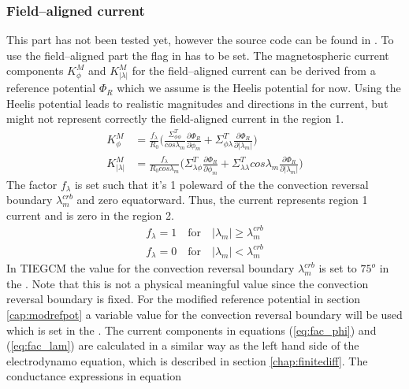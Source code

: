 \subsubsection{Field--aligned current}\label{cap:fldalg_curr}
%
This part has not been tested yet, however the source code can be found in 
. To use the field--aligned part 
the flag   
in   has to be set. 
The magnetospheric current components $K_{\phi}^M$ and 
$K_{|\lambda|}^M$ for the field--aligned current can be derived 
from a reference potential 
$\Phi_R$ which we assume is the Heelis potential for now. Using the
Heelis potential leads to realistic magnitudes and directions 
in the current, but
might not represent correctly the field-aligned current in the region 1.
%
\begin{align}
  K_{\phi}^M       &=  \frac{f_{\lambda}}{R_0} \bigl( \frac{\Sigma_{\phi \phi}^T}{cos
   \lambda_m} \frac{\partial \Phi_R}{\partial \phi_m} + 
   \Sigma_{\phi \lambda}^T \frac{\partial \Phi_R}{\partial |\lambda_m|} \bigr) \label{eq:fac_phi}\\
  K_{|\lambda|}^M  &= \frac{f_{\lambda}}{R_0 cos \lambda_m} \bigl( \Sigma_{\lambda \phi}^T
    \frac{\partial \Phi_R}{\partial \phi_m} + 
   \Sigma_{\lambda \lambda}^T cos \lambda_m 
   \frac{\partial \Phi_R}{\partial |\lambda_m|} \bigr) \label{eq:fac_lam}
\end{align}
%
The factor $f_{\lambda}$ is set such that it's 1 poleward of the the convection reversal
boundary $ \lambda_m^{crb}$ and zero equatorward. Thus, the current 
represents region 1 current and is zero in the region 2.
%
\begin{align}
  f_{\lambda} = 1 \quad \text{for} \quad |\lambda_m| \ge  \lambda_m^{crb} \\ 
  f_{\lambda} = 0 \quad \text{for} \quad |\lambda_m| <  \lambda_m^{crb} 
\end{align}
%
In TIEGCM the value for the convection reversal boundary $ \lambda_m^{crb}$  
is set to $75^o$ in the
. Note that this is not a physical meaningful value since 
the convection reversal boundary is fixed.
For the modified reference potential in section \ref{cap:modrefpot} 
a variable value for the convection reversal boundary will
be used which is set in the . 
The current components in equations (\ref{eq:fac_phi}) and (\ref{eq:fac_lam})
are calculated in a similar way as the left hand side of the electrodynamo 
equation, which is described in section
\ref{chap:finitediff}. The conductance expressions in equation 
